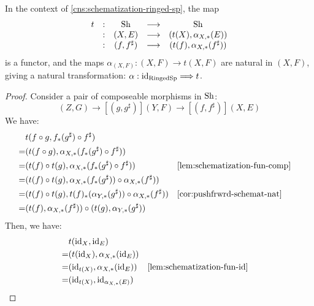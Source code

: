 \begin{lem}\label{lem:schemat-ringed-sp-fun}
In the context of \cref{cns:schematization-ringed-sp}, the map
\[\begin{array}{ccccc}
t &:& \Sh &\to& \Sh \\
  &:& (X, E) &\to& (t(X), \alpha_{X, *}(E)) \\
  &:& (f, f^\sharp)
        &\to& (t(f), \alpha_{X, *}(f^\sharp)) \\
\end{array}\]
is a functor, and the maps $\alpha_{(X, F)} : (X, F) \to t(X, F)$
are natural in $(X, F)$, giving a natural transformation:
$\alpha : \id_{\mathrm{RingedSp}} \To t$.
\end{lem}
\begin{proof}
Consider a pair of composeable morphisms in $\mathrm{Sh}$:
\[
(Z, G) \to[{(g, g^\sharp)}] (Y, F) \to[{(f, f^\sharp)}] (X, E)
\]
We have:
\begin{align*}
 & t(f \circ g, f_*(g^\sharp) \circ f^\sharp) \\
=& (t(f \circ g), \alpha_{X, *}(f_*(g^\sharp) \circ f^\sharp)) \\
=& (t(f) \circ t(g), \alpha_{X, *}(f_*(g^\sharp) \circ f^\sharp))
    && \text{\cref{lem:schematization-fun-comp}} \\
=& (t(f) \circ t(g),
    \alpha_{X, *}(f_*(g^\sharp)) \circ \alpha_{X, *}(f^\sharp)) \\
=& (t(f) \circ t(g),
    t(f)_*(\alpha_{Y, *}(g^\sharp)) \circ \alpha_{X, *}(f^\sharp))
    && \text{\cref{cor:pushfrwrd-schemat-nat}} \\
=& (t(f), \alpha_{X, *}(f^\sharp)) \circ (t(g), \alpha_{Y, *}(g^\sharp))
\end{align*}
Then, we have:
\begin{align*}
 & t(\id_X, \id_{E}) \\
=& (t(\id_X), \alpha_{X, *}(\id_E)) \\
=& (\id_{t(X)}, \alpha_{X, *}(\id_E))
    && \text{\cref{lem:schematization-fun-id}} \\
=& (\id_{t(X)}, \id_{\alpha_{X, *}(E)})
\end{align*}


\end{proof}
